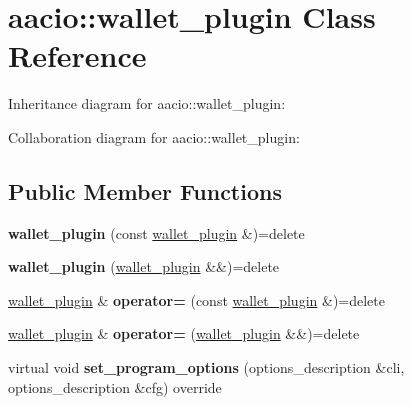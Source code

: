 \hypertarget{classaacio_1_1wallet__plugin}{}\section{aacio\+:\+:wallet\+\_\+plugin Class Reference}
\label{classaacio_1_1wallet__plugin}


Inheritance diagram for aacio\+:\+:wallet\+\_\+plugin\+:


Collaboration diagram for aacio\+:\+:wallet\+\_\+plugin\+:
\subsection*{Public Member Functions}
\begin{DoxyCompactItemize}
\item 
\mbox{\label{classaacio_1_1wallet__plugin_adda150cfb64653aed4b702ae4777a5b3}} 
{\bfseries wallet\+\_\+plugin} (const \mbox{\hyperlink{classaacio_1_1wallet__plugin}{wallet\+\_\+plugin}} \&)=delete
\item 
\mbox{\label{classaacio_1_1wallet__plugin_a61e52d4a28323674e0b0f5c39234a0e0}} 
{\bfseries wallet\+\_\+plugin} (\mbox{\hyperlink{classaacio_1_1wallet__plugin}{wallet\+\_\+plugin}} \&\&)=delete
\item 
\mbox{\label{classaacio_1_1wallet__plugin_ab7e50e244a72fdc2b075111e65eb7f44}} 
\mbox{\hyperlink{classaacio_1_1wallet__plugin}{wallet\+\_\+plugin}} \& {\bfseries operator=} (const \mbox{\hyperlink{classaacio_1_1wallet__plugin}{wallet\+\_\+plugin}} \&)=delete
\item 
\mbox{\label{classaacio_1_1wallet__plugin_aa5795119c0615f879942a4b32086dcad}} 
\mbox{\hyperlink{classaacio_1_1wallet__plugin}{wallet\+\_\+plugin}} \& {\bfseries operator=} (\mbox{\hyperlink{classaacio_1_1wallet__plugin}{wallet\+\_\+plugin}} \&\&)=delete
\item 
\mbox{\label{classaacio_1_1wallet__plugin_a1fac27382d160d15c840cd3c9313b7ac}} 
virtual void {\bfseries set\+\_\+program\+\_\+options} (options\+\_\+description \&cli, options\+\_\+description \&cfg) override
\item 

\end{DoxyCompactItemize}
